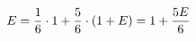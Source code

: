 \documentclass[preview]{standalone}
\begin{document}
\begin{align*}
\special{dvisvgm:raw <g id='unique000'>}E=\dfrac{1}{6}\cdot 1+\dfrac{5}{6}\cdot(1+E)=1+\dfrac{5E}{6}\special{dvisvgm:raw </g>}
\end{align*}
\end{document}
